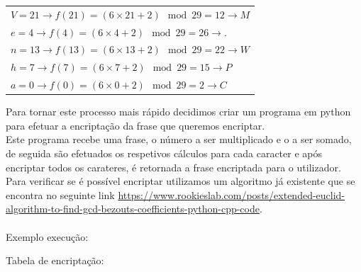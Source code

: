 \documentclass[12pt]{article}
\begin{document}
         
    \begin{center}
    \begin{tabular}{@{}l@{}}
    \(V = 21 \rightarrow f(21) = (6 \times 21 + 2) \mod 29 = 12 \rightarrow M \)\\
     \(e = 4 \rightarrow f(4) = (6 \times 4 + 2) \mod 29 = 26 \rightarrow . \)\\
     \(n = 13 \rightarrow f(13) = (6 \times 13 + 2) \mod 29 = 22 \rightarrow W \)\\
     \(h = 7 \rightarrow f(7) = (6 \times 7 + 2) \mod 29 = 15 \rightarrow P \)\\
     \(a = 0 \rightarrow f(0) = (6 \times 0 + 2) \mod 29 = 2  \rightarrow C \)\\
    \end{tabular}
    \end{center}
    
    \noindent Para tornar este processo mais rápido decidimos criar um programa em python para efetuar a encriptação da frase que queremos encriptar.\\
    \newpage
    \noindent Este programa recebe uma frase, o número a ser multiplicado e o a ser somado, de seguida são efetuados os respetivos cálculos para cada caracter e após encriptar todos os carateres, é retornada a frase encriptada para o utilizador. Para verificar se é possível encriptar utilizamos um algoritmo já existente que se encontra no seguinte link \url{https://www.rookieslab.com/posts/extended-euclid-algorithm-to-find-gcd-bezouts-coefficients-python-cpp-code}.\\\\
    Exemplo execução:
    \begin{center}
    \end{center}
    
    \noindent Tabela de encriptação:\\
    \begin{table}[hbt!]
    \end{table}
    
\end{document}
